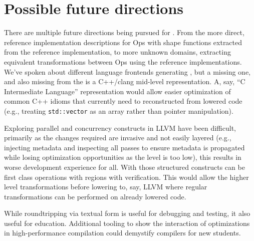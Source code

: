 \section{Possible future directions}

There are multiple future directions being pursued for \MLIR. From the more direct, reference implementation descriptions for Ops with shape functions extracted from the reference implementation, to more unknown domains, extracting equivalent transformations between Ops using the reference implementations. We've spoken about different language frontends generating \MLIR, but a missing one, and also missing from the  is a C++/clang mid-level representation. A, say, ``C Intermediate Language'' representation would allow easier optimization of common C++ idioms that currently need to reconstructed from lowered code (e.g., treating \lstinline{std::vector} as an array rather than pointer manipulation).

Exploring parallel and concurrency constructs in LLVM have been difficult, primarily as the changes required are invasive and not easily layered (e.g., injecting metadata and inspecting all passes to ensure metadata is propagated while losing optimization opportunities as the level is too low), this results in worse development experience for all. With \MLIR those structured constructs can be first class operations with regions with verification. This would allow the higher level transformations before lowering to, say, LLVM where regular transformations can be performed on already lowered code.

While roundtripping via textual form is useful for debugging and testing, it also useful for education. Additional tooling to show the interaction of optimizations in high-performance compilation could demystify compilers for new students.
